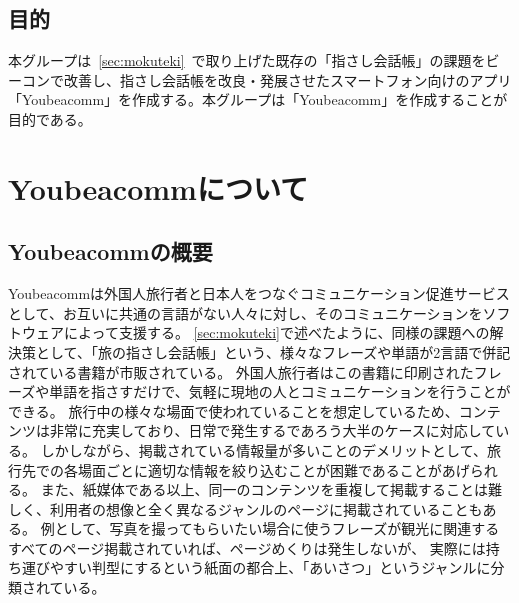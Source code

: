 \documentclass[11pt,papersize]{jsbook}
\begin{document}
\section{目的}
 本グループは~\ref{sec:mokuteki}~で取り上げた既存の「指さし会話帳」の課題をビーコンで改善し、指さし会話帳を改良・発展させたスマートフォン向けのアプリ「Youbeacomm」を作成する。本グループは「Youbeacomm」を作成することが目的である。


\chapter{Youbeacommについて}

\section{Youbeacommの概要}
 Youbeacommは外国人旅行者と日本人をつなぐコミュニケーション促進サービスとして、お互いに共通の言語がない人々に対し、そのコミュニケーションをソフトウェアによって支援する。
\ref{sec:mokuteki}で述べたように、同様の課題への解決策として、「旅の指さし会話帳」という、様々なフレーズや単語が2言語で併記されている書籍が市販されている。
外国人旅行者はこの書籍に印刷されたフレーズや単語を指さすだけで、気軽に現地の人とコミュニケーションを行うことができる。
旅行中の様々な場面で使われていることを想定しているため、コンテンツは非常に充実しており、日常で発生するであろう大半のケースに対応している。
しかしながら、掲載されている情報量が多いことのデメリットとして、旅行先での各場面ごとに適切な情報を絞り込むことが困難であることがあげられる。
また、紙媒体である以上、同一のコンテンツを重複して掲載することは難しく、利用者の想像と全く異なるジャンルのページに掲載されていることもある。
例として、写真を撮ってもらいたい場合に使うフレーズが観光に関連するすべてのページ掲載されていれば、ページめくりは発生しないが、
実際には持ち運びやすい判型にするという紙面の都合上、「あいさつ」というジャンルに分類されている。
\end{document}
